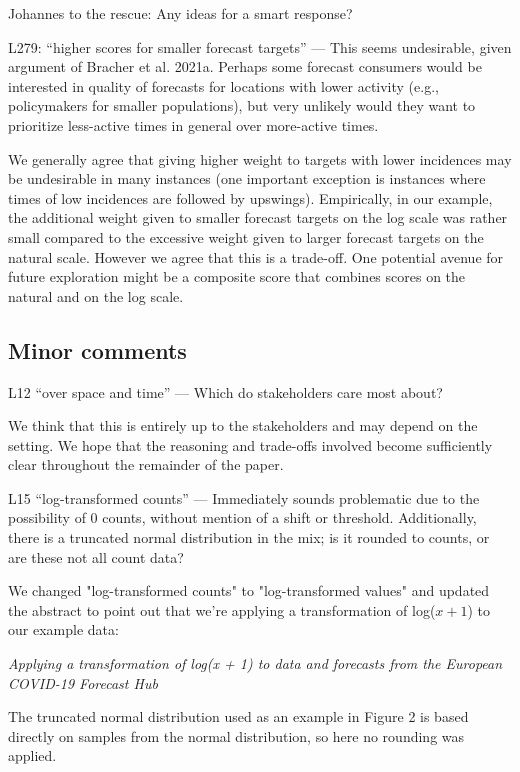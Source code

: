 \documentclass{article}
\newcommand{\black}{\color{black}}
\newcommand{\blue}{\color{blue}}
\begin{document}
\black
Johannes to the rescue: Any ideas for a smart response? 

\blue
L279: “higher scores for smaller forecast targets” — This seems undesirable, given argument of Bracher et al. 2021a. Perhaps some forecast consumers would be interested in quality of forecasts for locations with lower activity (e.g., policymakers for smaller populations), but very unlikely would they want to prioritize less-active times in general over more-active times.  

\black 
We generally agree that giving higher weight to targets with lower incidences may be undesirable in many instances (one important exception is instances where times of low incidences are followed by upswings). Empirically, in our example, the additional weight given to smaller forecast targets on the log scale was rather small compared to the excessive weight given to larger forecast targets on the natural scale. However we agree that this is a trade-off. One potential avenue for future exploration might be a composite score that combines scores on the natural and on the log scale. 

\subsection{Minor comments}

\blue
L12 “over space and time” — Which do stakeholders care most about?

\black
We think that this is entirely up to the stakeholders and may depend on the setting. We hope that the reasoning and trade-offs involved become sufficiently clear throughout the remainder of the paper. 

\blue
L15 “log-transformed counts” — Immediately sounds problematic due to the possibility of 0 counts, without mention of a shift or threshold. Additionally, there is a truncated normal distribution in the mix; is it rounded to counts, or are these not all count data?

\black
We changed "log-transformed counts" to "log-transformed values" and updated the abstract to point out that we're applying a transformation of log($x + 1$) to our example data: 

\textit{Applying a transformation of log(x + 1) to data and forecasts from the European COVID-19 Forecast Hub}

The truncated normal distribution used as an example in Figure 2 is based directly on samples from the normal distribution, so here no rounding was applied. 
\end{document}
